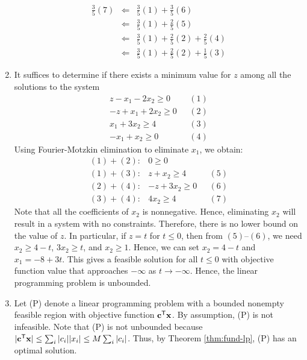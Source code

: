 \begin{enumerate}
  \begin{eqnarray*}
  \frac{3}{5} (7)
  & \Leftarrow & \frac{3}{5} (1) + \frac{3}{5} (6) \\
  & \Leftarrow & \frac{3}{5} (1) + \frac{2}{5} (5) \\
  & \Leftarrow & \frac{3}{5} (1) + \frac{2}{5} (2) + \frac{2}{5} (4)  \\
  & \Leftarrow & \frac{3}{5} (1) + \frac{2}{5} (2) + \frac{1}{5} (3)
  \end{eqnarray*}
\item
  It suffices to determine if there exists a minimum value for \(z\)
  among all the solutions to the system \[
  \begin{array}{rl}
  z-  x_1 - 2x_2 \geq 0 & ~~~(1) \\
  -z+  x_1 + 2x_2 \geq 0 &  ~~~(2)\\
  x_1 + 3x_2   \geq 4 &  ~~~(3)\\
  -x_1 + x_2  \geq 0 & ~~~(4)
  \end{array}
  \] Using Fourier-Motzkin elimination to eliminate \(x_1\), we obtain:
  \[
  \begin{array}{rrl}
  (1) + (2): &  0 \geq 0 \\
  (1) + (3): & z +  x_2 \geq 4 &  ~~~(5)\\
  (2) + (4): & - z + 3x_2 \geq 0 & ~~~(6) \\
  (3) + (4): & 4x_2 \geq 4 & ~~~(7)
  \end{array}
  \] Note that all the coefficients of \(x_2\) is nonnegative. Hence,
  eliminating \(x_2\) will result in a system with no constraints.
  Therefore, there is no lower bound on the value of \(z\). In
  particular, if \(z = t\) for \(t\leq 0\), then from \((5)\)--\((6)\),
  we need \(x_2 \geq 4-t\), \(3x_2 \geq t\), and \(x_2 \geq 1\). Hence,
  we can set \(x_2 = 4-t\) and \(x_1 = -8+3t\). This gives a feasible
  solution for all \(t \leq 0\) with objective function value that
  approaches \(-\infty\) as \(t \rightarrow -\infty\). Hence, the linear
  programming problem is unbounded.
\item
  Let (P) denote a linear programming problem with a bounded nonempty
  feasible region with objective function \(\mathbf{c}^{\mathsf{T}}\mathbf{x}\). By
  assumption, (P) is not infeasible. Note that (P) is not unbounded
  because
  \(|\mathbf{c}^{\mathsf{T}}\mathbf{x}| \leq \sum_{i} |c_i||x_i| \leq M \sum_{i} |c_i| \).
  Thus, by Theorem \ref{thm:fund-lp}, (P) has an optimal solution.
\end{enumerate}
